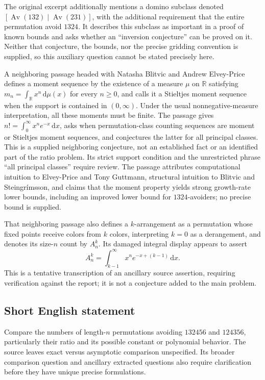 \documentclass[11pt]{article}
\newcommand{\R}{\mathbb{R}}
\begin{document}
The original excerpt additionally mentions a domino subclass denoted \([\operatorname{Av}(132)\mid\operatorname{Av}(231)]\), with the additional requirement that the entire permutation avoid \(1324\). It describes this subclass as important in a proof of known bounds and asks whether an ``inversion conjecture'' can be proved on it. Neither that conjecture, the bounds, nor the precise gridding convention is supplied, so this auxiliary question cannot be stated precisely here.

A neighboring passage headed with Natasha Blitvic and Andrew Elvey-Price defines a moment sequence by the existence of a measure \(\mu\) on \(\R\) satisfying \(m_n=\int_{\R}x^n\,\mathrm{d}\mu(x)\) for every \(n\geq0\), and calls it a Stieltjes moment sequence when the support is contained in \((0,\infty)\). Under the usual nonnegative-measure interpretation, all these moments must be finite. The passage gives \(n!=\int_0^\infty x^n e^{-x}\,\mathrm{d}x\), asks when permutation-class counting sequences are moment or Stieltjes moment sequences, and conjectures the latter for all principal classes. This is a supplied neighboring conjecture, not an established fact or an identified part of the ratio problem. Its strict support condition and the unrestricted phrase ``all principal classes'' require review. The passage attributes computational intuition to Elvey-Price and Tony Guttmann, structural intuition to Blitvic and Steingr\'{i}msson, and claims that the moment property yields strong growth-rate lower bounds, including an improved lower bound for \(1324\)-avoiders; no precise bound is supplied.

That neighboring passage also defines a \(k\)-arrangement as a permutation whose fixed points receive colors from \(k\) colors, interpreting \(k=0\) as a derangement, and denotes its size-\(n\) count by \(A_n^k\). Its damaged integral display appears to assert
\[
A_n^k=\int_{k-1}^{\infty}x^n e^{-x+(k-1)}\,\mathrm{d}x.
\]
This is a tentative transcription of an ancillary source assertion, requiring verification against the report; it is not a conjecture added to the main problem.
\subsection{Short English statement}
Compare the numbers of length-\(n\) permutations avoiding \(132456\) and \(124356\), particularly their ratio and its possible constant or polynomial behavior. The source leaves exact versus asymptotic comparison unspecified. Its broader comparison question and ancillary extracted questions also require clarification before they have unique precise formulations.
\end{document}

